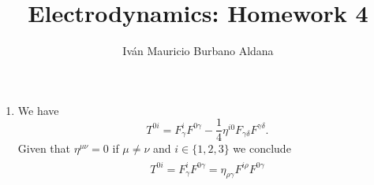 \documentclass{article}
\title{Electrodynamics: Homework 4}
\author{Iván Mauricio Burbano Aldana}
\begin{document}
\maketitle

\begin{enumerate}

\item We have
\begin{equation}
T^{0i}=F^i_\gamma F^{0\gamma}-\frac{1}{4}\eta^{i0}F_{\gamma\delta}F^{\gamma\delta}.
\end{equation}
Given that $\eta^{\mu\nu}=0$ if $\mu\neq\nu$ and $i\in\{1,2,3\}$ we conclude
\begin{align}
\begin{split}
T^{0i}=F^i_\gamma F^{0\gamma}=\eta_{\rho\gamma}F^{i\rho}F^{0\gamma}
\end{split}
\end{align}

\end{enumerate}
\end{document}
